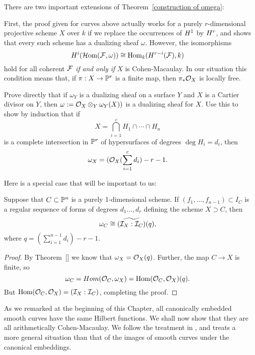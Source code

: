 \begin{fact}  There are two important extensions of Theorem~\ref{construction of omega}:

First, the proof given for curves above actually works for a purely $r$-dimensional projective scheme $X$ over $k$ if we replace the occurrences of  $\HH^{1}$ by $\HH^{r}$, and shows that every such scheme has a dualizing sheaf $\omega$. However, the isomorphisms
$$
\HH^{i} (\sHom(\sF, \omega)) \cong \Hom_{k}(\HH^{r-i}(\sF), k) 
$$
hold for all coherent $\sF$ \emph{ if and only if} $X$ is Cohen-Macaulay. In our situation
this condition means that, if $\pi: X\to \PP^{r}$ is a finite map, then $\pi_{*}\cO_{X}$
is locally free.
\end{fact}

 

\begin{exercise} Prove directly that if $\omega_{Y}$ is a dualizing sheaf on a surface $Y$ and $X$ is a Cartier divisor on $Y$, then
$\omega := \cO_{X}\otimes_{Y}\omega_{Y}(X))$ is a dualizing sheaf for $X$.  
Use this to show by induction that if 
$$
X = \bigcap_{i=1}^{c}H_{1}\cap \cdots \cap H_{n}
$$ 
is a complete intersection
in $\PP^{r}$ of hypersurfaces of degrees $\deg H_{i} = d_{i}$,  then
$$
\omega_{X} = (\cO_{X}(\sum_{i=1}^{c} d_{i}) - r-1.
$$
\end{exercise}

Here is a special case that will be important to us:
\begin{proposition}\label{computation of omega}
 Suppose that 
$C \subset \PP^{n}$ is a purely 1-dimensional scheme. If $(f_{1}, \dots, f_{n-1}) \subset I_{C}$ is a regular sequence of forms of degrees $d_{1}\dots,d_{r}$ defining the scheme $X\supset C$, then 
$$
\omega_{C}\cong \widetilde{(\cI_{X}:\cI_{C})}(q),
$$
where $q = (\sum_{i=1}^{n-1} d_{i}) -r-1.$
\end{proposition}
\begin{proof}
 By Theorem~\ref{} we know that $\omega_{X} = \cO_{X}(q)$. Further, the map
 $C\to X$ is finite, so 
 $$
 \omega_{C} = Hom(\cO_{C}, \omega_{X}) = \Hom(\cO_{C}, \cO_{X})(q).
 $$
 But $\Hom(\cO_{C}, \cO_{X}) = (\cI_{X}:\cI_{C})$, completing the proof.
\end{proof}

As we remarked at the beginning of this Chapter, all canonically embedded smooth curves have the same Hilbert functions. We shall now show that they are all arithmetically Cohen-Macaulay.
We follow the treatment in \cite{Schreyer}, and treats a more general situation than that of the 
images of smooth curves under the canonical embeddings.

